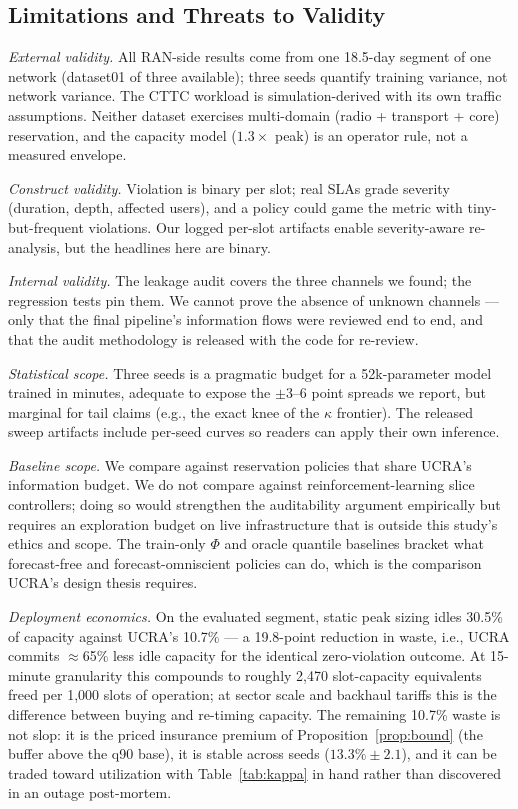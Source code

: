 \subsection{Limitations and Threats to Validity}

\emph{External validity.} All RAN-side results come from one
18.5-day segment of one network (dataset01 of three available);
three seeds quantify training variance, not network variance. The
CTTC workload is simulation-derived with its own traffic
assumptions. Neither dataset exercises multi-domain (radio +
transport + core) reservation, and the capacity model
($1.3\times$ peak) is an operator rule, not a measured envelope.

\emph{Construct validity.} Violation is binary per slot; real SLAs
grade severity (duration, depth, affected users), and a policy could
game the metric with tiny-but-frequent violations. Our logged
per-slot artifacts enable severity-aware re-analysis, but the
headlines here are binary.

\emph{Internal validity.} The leakage audit covers the three
channels we found; the regression tests pin them. We cannot prove
the absence of unknown channels --- only that the final pipeline's
information flows were reviewed end to end, and that the audit
methodology is released with the code for re-review.

\emph{Statistical scope.} Three seeds is a pragmatic budget for a
52k-parameter model trained in minutes, adequate to expose the
$\pm 3$--6 point spreads we report, but marginal for tail claims
(e.g., the exact knee of the $\kappa$ frontier). The released sweep
artifacts include per-seed curves so readers can apply their own
inference.

\emph{Baseline scope.} We compare against reservation policies that
share UCRA's information budget. We do not compare against
reinforcement-learning slice controllers; doing so would strengthen
the auditability argument empirically but requires an exploration
budget on live infrastructure that is outside this study's ethics
and scope. The train-only $\Phi$ and oracle quantile baselines
bracket what forecast-free and forecast-omniscient policies can do,
which is the comparison UCRA's design thesis requires.

\emph{Deployment economics.} On the evaluated segment, static peak
sizing idles 30.5\% of capacity against UCRA's 10.7\% --- a 19.8-point
reduction in waste, i.e., UCRA commits $\approx$65\% less idle
capacity for the identical zero-violation outcome. At 15-minute
granularity this compounds to roughly 2{,}470 slot-capacity
equivalents freed per 1{,}000 slots of operation; at sector scale and
backhaul tariffs this is the difference between buying and
re-timing capacity. The remaining 10.7\% waste is not slop: it is
the priced insurance premium of Proposition~\ref{prop:bound}
(the buffer above the q90 base), it is stable across seeds
($13.3\% \pm 2.1$), and it can be traded toward utilization with
Table~\ref{tab:kappa} in hand rather than discovered in an outage
post-mortem.

